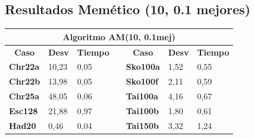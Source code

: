 \documentclass[a4paper, 12pt]{article}
\begin{document}
      \subsection{Resultados Memético (10, 0.1 mejores)}
      \begin{table}[H]
\centering
\label{my-label}
\begin{tabular}{|l|l|l|l|l|l|l|}
\hline
\multicolumn{7}{|c|}{\textbf{Algoritmo AM(10, 0.1mej)}}                                                                                                                                                                                                           \\ \hline
\multicolumn{1}{|c|}{\textbf{Caso}} & \multicolumn{1}{c|}{\textbf{Desv}} & \multicolumn{1}{c|}{\textbf{Tiempo}} & \multicolumn{1}{c|}{\textbf{}} & \multicolumn{1}{c|}{\textbf{Caso}} & \multicolumn{1}{c|}{\textbf{Desv}} & \multicolumn{1}{c|}{\textbf{Tiempo}} \\ \cline{1-3} \cline{5-7} 
\textbf{Chr22a}                     & 10,23                              & 0,05                                 &                                & \textbf{Sko100a}                   & 1,52                               & 0,55                                 \\ \cline{1-3} \cline{5-7} 
\textbf{Chr22b}                     & 13,98                              & 0,05                                 &                                & \textbf{Sko100f}                   & 2,11                               & 0,59                                 \\ \cline{1-3} \cline{5-7} 
\textbf{Chr25a}                     & 48,05                              & 0,06                                 &                                & \textbf{Tai100a}                   & 4,16                               & 0,67                                 \\ \cline{1-3} \cline{5-7} 
\textbf{Esc128}                     & 21,88                              & 0,97                                 &                                & \textbf{Tai100b}                   & 1,80                               & 0,61                                 \\ \cline{1-3} \cline{5-7} 
\textbf{Had20}                      & 0,46                               & 0,04                                 &                                & \textbf{Tai150b}                   & 3,32                               & 1,24                                 \\ \cline{1-3} \cline{5-7} 

\end{tabular}
\end{table}
\end{document}
